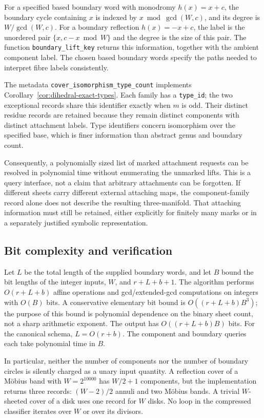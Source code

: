 For a specified based boundary word with monodromy $h(x)=x+c$, the
boundary cycle containing $x$ is indexed by
$x\bmod\gcd(W,c)$, and its degree is $W/\gcd(W,c)$.
For a boundary reflection $h(x)=-x+c$, the label is the unordered
pair $\{x,c-x\bmod W\}$ and the degree is the size of this pair.
The function \texttt{boundary\_lift\_key} returns this information,
together with the ambient component label.  The chosen based boundary
words specify the paths needed to interpret fibre labels consistently.

The metadata \texttt{cover\_isomorphism\_type\_count} implements
Corollary~\ref{cor:dihedral-exact-types}.  Each family has a
\texttt{type\_id}; the two exceptional records share this identifier
exactly when $m$ is odd.  Their distinct residue records are retained
because they remain distinct components with distinct attachment
labels.  Type identifiers concern isomorphism over the specified base,
which is finer information than abstract genus and boundary count.

Consequently, a polynomially sized list of marked attachment requests
can be resolved in polynomial time without enumerating the unmarked
lifts.  This is a query interface, not a claim that arbitrary
attachments can be forgotten.  If different sheets carry different
external attaching maps, the component-family record alone does not
describe the resulting three-manifold.  That attaching information
must still be retained, either explicitly for finitely many marks or in
a separately justified symbolic representation.

\subsection{Bit complexity and verification}

Let $L$ be the total length of the supplied boundary words, and let
$B$ bound the bit lengths of the integer inputs, $W$, and $r+L+b+1$.
The algorithm performs $O(r+L+b)$ affine operations and gcd/extended-gcd
computations on integers with $O(B)$ bits.  A conservative elementary
bit bound is $O((r+L+b)B^3)$; the purpose of this bound is polynomial
dependence on the binary sheet count, not a sharp arithmetic exponent.
The output has $O((r+L+b)B)$ bits.  For the canonical schema,
$L=O(r+b)$.  The component and boundary queries each take polynomial
time in $B$.

In particular, neither the number of components nor the number of
boundary circles is silently charged as a unary input quantity.  A
reflection cover of a M\"obius band with $W=2^{10000}$ has
$W/2+1$ components, but the implementation returns three records:
$(W-2)/2$ annuli and two M\"obius bands.  A trivial $W$-sheeted cover
of a disk uses one record for $W$ disks.  No loop in the compressed
classifier iterates over $W$ or over its divisors.

